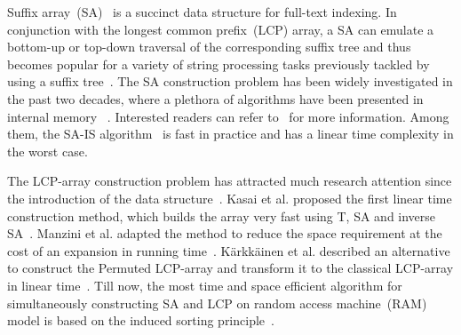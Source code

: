 \documentclass[10pt,journal,compsoc]{IEEEtran}
\begin{document}
\begin{CJK*}{GBK}{song}
\maketitle


\IEEEdisplaynontitleabstractindextext



%
\IEEEpeerreviewmaketitle



{

Suffix array~(SA)~\cite{Manber1993} is a succinct data structure for full-text indexing. In conjunction with the longest common prefix~(LCP) array, a SA can emulate a bottom-up or top-down traversal of the corresponding suffix tree and thus becomes popular for a variety of string processing tasks previously tackled by using a suffix tree~\cite{Abouelhodaa2004}. The SA construction problem has been widely investigated in the past two decades, where a plethora of algorithms have been presented in internal memory ~\cite{Burkhardt2003,Manzini2004,Schurmann2007, Ko2003, Kim2004, Karkkainen2003,nong2011}. Interested readers can refer to~\cite{Puglisi2007} for more information. Among them, the SA-IS algorithm~\cite{nong2011} is fast in practice and has a linear time complexity in the worst case.

The LCP-array construction problem has attracted much research attention since the introduction of the data structure~\cite{Manber1993}. Kasai et al. proposed the first linear time construction method, which builds the array very fast using T, SA and inverse SA~\cite{Kasai2001}. Manzini et al. adapted the method to reduce the space requirement at the cost of an expansion in running time~\cite{Manzini2004-2}. K\"{a}rkk\"{a}inen et al. described an alternative to construct the Permuted LCP-array and transform it to the classical LCP-array in linear time~\cite{Karkkainen2009}. Till now, the most time and space efficient algorithm for simultaneously constructing SA and LCP on random access machine~(RAM) model is based on the induced sorting principle~\cite{Fischer11}.
}


\end{CJK*}
\end{document}

